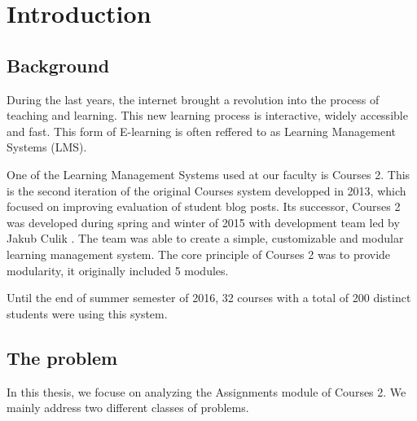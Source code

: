 \chapter*{Introduction}

\section*{Background}
During the last years, the internet brought a revolution into the process of teaching and learning. This new learning process is interactive, widely accessible and fast. This form of E-learning is often reffered to as Learning Management Systems (LMS).

%

One of the Learning Management Systems used at our faculty is Courses 2. This is the second iteration of the original Courses system developped in 2013, which focused on improving evaluation of student blog posts.  Its successor, Courses 2  was developed during spring and winter of 2015 with development team led by Jakub Culik \cite{culik}. The team was able to create a simple, customizable and modular learning management system. The core principle of Courses 2 was to provide modularity, it originally included 5 modules. 

Until the end of summer semester of 2016, 32 courses with a total of 200 distinct students were using this system.

\section*{The problem}

In this thesis, we focuse on analyzing the Assignments module of Courses 2. We mainly address two different classes of problems.

